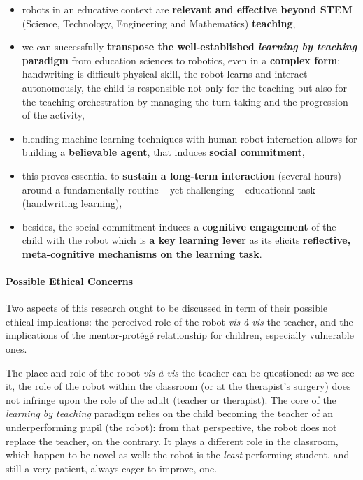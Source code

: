 \documentclass{article}
\begin{document}
\begin{itemize}
    \item robots in an educative context are \textbf{relevant and effective
        beyond STEM} (Science, Technology, Engineering and Mathematics)
    \textbf{teaching},

    \item we can successfully \textbf{transpose the well-established
        \emph{learning by teaching} paradigm} from education sciences to
        robotics, even in a \textbf{complex form}: handwriting is difficult
        physical skill, the robot learns and interact autonomously, the child is
        responsible not only for the teaching but also for the teaching
        orchestration by managing the turn taking and the progression of the
        activity,

    \item blending machine-learning techniques with human-robot interaction
        allows for building a \textbf{believable agent}, that induces
        \textbf{social commitment},

    \item this proves essential to \textbf{sustain a long-term interaction} (several
        hours) around a fundamentally routine -- yet challenging -- educational
        task (handwriting learning),

    \item besides, the social commitment induces a \textbf{cognitive engagement}
        of the child with the robot which is \textbf{a key learning lever} as
        its elicits \textbf{reflective, meta-cognitive mechanisms on the
        learning task}.
\end{itemize}

\paragraph{Possible Ethical Concerns} Two aspects of this research ought to be
discussed in term of their possible ethical implications: the perceived role of
the robot \textit{vis-à-vis} the teacher, and the implications of the
mentor-protégé relationship for children, especially vulnerable ones.

The place and role of the robot \textit{vis-à-vis} the teacher can be
questioned: as we see it, the role of the robot within the classroom (or at the
therapist's surgery) does not infringe upon the role of the adult (teacher or
therapist).  The core of the \emph{learning by teaching} paradigm relies on the
child becoming the teacher of an underperforming pupil (the robot): from that
perspective, the robot does not replace the teacher, on the contrary. It plays a
different role in the classroom, which happen to be novel as well: the robot is
the \emph{least} performing student, and still a very patient, always eager to
improve, one.
\end{document}
